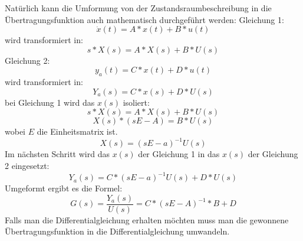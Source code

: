 Natürlich kann die Umformung von der Zustandsraumbeschreibung in die Übertragungsfunktion auch mathematisch durchgeführt werden:
Gleichung 1:
\begin{equation}
	\dot{x}(t)=A*x(t)+B*u(t)
\end{equation}
wird transformiert in:
\begin{equation}
	s*X(s)=A*X(s)+B*U(s)
\end{equation}
Gleichung 2:
\begin{equation}
	y_{a}(t)=C*x(t)+D*u(t)
\end{equation}
wird transformiert in:
\begin{equation}
	Y_{a}(s)=C*x(s)+D*U(s)
\end{equation}
bei Gleichung 1 wird  das $x(s)$ isoliert:
\begin{equation}
	s*X(s)=A*X(s)+B*U(s)
\end{equation}
\begin{equation}
	X(s)*(sE-A)=B*U(s)
\end{equation}
wobei $E$ die Einheitsmatrix ist.
\begin{equation}
	X(s)=(sE-a)^{-1}U(s)
\end{equation}
Im nächsten Schritt wird das $x(s)$ der Gleichung 1 in das $x(s)$ der Gleichung 2 eingesetzt:
\begin{equation}
	Y_{a}(s)=C*(sE-a)^{-1}U(s)+D*U(s)
\end{equation}
Umgeformt ergibt es die Formel:
\begin{equation}
	G(s)=\frac{Y_{a}(s)}{U(s)}=C*(sE-A)^{-1}*B+D
\end{equation}
Falls man die Differentialgleichung erhalten möchten muss man die gewonnene Übertragungsfunktion in die Differentialgleichung umwandeln.
